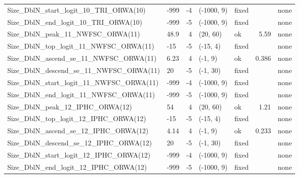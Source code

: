 \documentclass[
]{scrartcl}
\begin{document}
\begin{landscape}
\begin{longtable}{llrllrl}
Size\_DblN\_start\_logit\_10\_TRI\_ORWA(10) & -999 & -4 & (-1000, 9) & fixed &  & none \\ 
Size\_DblN\_end\_logit\_10\_TRI\_ORWA(10) & -999 & -5 & (-1000, 9) & fixed &  & none \\ 
Size\_DblN\_peak\_11\_NWFSC\_ORWA(11) & 48.9 & 4 & (20, 60) & ok & 5.59 & none \\ 
Size\_DblN\_top\_logit\_11\_NWFSC\_ORWA(11) & -15 & -5 & (-15, 4) & fixed &  & none \\ 
Size\_DblN\_ascend\_se\_11\_NWFSC\_ORWA(11) & 6.23 & 4 & (-1, 9) & ok & 0.386 & none \\ 
Size\_DblN\_descend\_se\_11\_NWFSC\_ORWA(11) & 20 & -5 & (-1, 30) & fixed &  & none \\ 
Size\_DblN\_start\_logit\_11\_NWFSC\_ORWA(11) & -999 & -4 & (-1000, 9) & fixed &  & none \\ 
Size\_DblN\_end\_logit\_11\_NWFSC\_ORWA(11) & -999 & -5 & (-1000, 9) & fixed &  & none \\ 
Size\_DblN\_peak\_12\_IPHC\_ORWA(12) & 54 & 4 & (20, 60) & ok & 1.21 & none \\ 
Size\_DblN\_top\_logit\_12\_IPHC\_ORWA(12) & -15 & -5 & (-15, 4) & fixed &  & none \\ 
Size\_DblN\_ascend\_se\_12\_IPHC\_ORWA(12) & 4.14 & 4 & (-1, 9) & ok & 0.233 & none \\ 
Size\_DblN\_descend\_se\_12\_IPHC\_ORWA(12) & 20 & -5 & (-1, 30) & fixed &  & none \\ 
Size\_DblN\_start\_logit\_12\_IPHC\_ORWA(12) & -999 & -4 & (-1000, 9) & fixed &  & none \\ 
Size\_DblN\_end\_logit\_12\_IPHC\_ORWA(12) & -999 & -5 & (-1000, 9) & fixed &  & none \\ 
\bottomrule

\end{longtable}

\endgroup

\end{landscape}

\newpage{}

\begingroup\fontsize{8}{10}\selectfont
\end{document}
